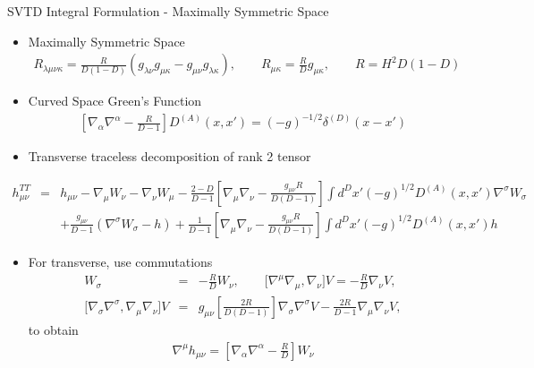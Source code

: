 \documentclass[8pt,aspectratio=1610]{beamer}
\begin{document}
\begin{frame}{SVTD Integral Formulation - Maximally Symmetric Space}
	\begin{itemize}
		\item Maximally Symmetric Space
		\begin{eqnarray}
		R_{\lambda\mu\nu\kappa} = \frac{R}{D(1-D)} (g_{\lambda\nu}g_{\mu\kappa} - g_{\mu\nu}g_{\lambda\kappa}),\qquad  R_{\mu\kappa} = \frac{R}{D}g_{\mu\kappa},\qquad	R=H^2D(1-D) 
		\end{eqnarray}
		\item Curved Space Green's Function
		\begin{eqnarray}
		\left[\nabla_\alpha \nabla^\alpha - \frac{R}{D-1}\right]D^{(A)}(x,x') = (-g)^{-1/2}\delta^{(D)} (x-x')
		\end{eqnarray}
		\item Transverse traceless decomposition of rank 2 tensor
	\end{itemize}
	\vspace{-1.5mm}
		\begin{eqnarray}
		h_{\mu\nu}^{TT} &=& h_{\mu\nu} - \nabla_\mu W_\nu - \nabla_\nu W_\mu 
		-\frac{2-D}{D-1}\left[ \nabla_\mu\nabla_\nu -\frac{ g_{\mu\nu}R}{D(D-1)}\right] \int d^Dx'(-g)^{1/2} D^{(A)}(x,x') \nabla^\sigma W_\sigma
		\nonumber\\
		&&+ \frac{g_{\mu\nu}}{D-1}(\nabla^\sigma W_\sigma - h)+\frac{1}{D-1}\left[ \nabla_\mu\nabla_\nu -\frac{g_{\mu\nu}R}{D(D-1)}\right] \int d^Dx'(-g)^{1/2} D^{(A)}(x,x') h
		\end{eqnarray}
	\vspace{-1.5mm}
	\begin{itemize}
		\item For transverse, use commutations
		\begin{eqnarray}
		[\nabla^\sigma, \nabla_\nu] W_\sigma &=& -\frac{R}{D}W_\nu
		,\qquad
		{[}\nabla^\mu \nabla_\mu, \nabla_\nu] V  = -\frac{R}{D}\nabla_\nu V
		,\nonumber\\
		{[}\nabla_\sigma\nabla^\sigma,\nabla_\mu\nabla_\nu]V &=& g_{\mu\nu}\left[\frac{2 R}{D(D-1)}\right]\nabla_\sigma\nabla^\sigma V - \frac{2R}{D-1}\nabla_\mu\nabla_\nu V,
		\end{eqnarray}
		to obtain
		\begin{eqnarray}
		\nabla^\mu h_{\mu\nu} = \left[ \nabla_\alpha\nabla^\alpha-\frac{R}{D} \right] W_\nu
		\end{eqnarray}
	\end{itemize}

\end{frame}
\end{document}
